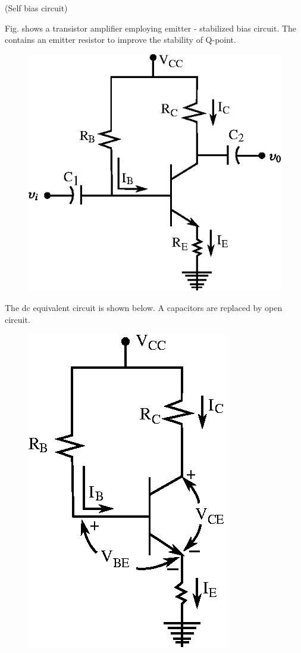  (Self bias circuit)

Fig. shows a transistor amplifier employing emitter - stabilized bias circuit. The contains an emitter resistor to improve the stability of Q-point.
\begin{figure}[H]
\centering
\includegraphics{chap3/fig3.10.eps}
\end{figure}

The dc equivalent circuit is shown below. A capacitors are replaced by open circuit.
\begin{figure}[H]
\centering
\includegraphics{chap3/fig3.11.eps}
\end{figure}

